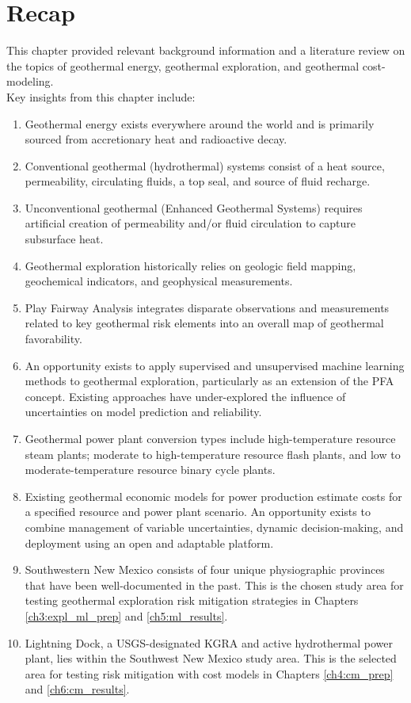 \section{Recap}\label{ch2:recap}
This chapter provided relevant background information and a literature review on the topics of geothermal energy, geothermal exploration, and geothermal cost-modeling.
\\
Key insights from this chapter include:
\begin{enumerate}
    \item Geothermal energy exists everywhere around the world and is primarily sourced from accretionary heat and radioactive decay.
    \item Conventional geothermal (hydrothermal) systems consist of a heat source, permeability, circulating fluids, a top seal, and source of fluid recharge.
    \item Unconventional geothermal (Enhanced Geothermal Systems) requires artificial creation of permeability and/or fluid circulation to capture subsurface heat.
    \item Geothermal exploration historically relies on geologic field mapping, geochemical indicators, and geophysical measurements.
    \item Play Fairway Analysis integrates disparate observations and measurements related to key geothermal risk elements into an overall map of geothermal favorability.
    \item An opportunity exists to apply supervised and unsupervised machine learning methods to geothermal exploration, particularly as an extension of the PFA concept. Existing approaches have under-explored the influence of uncertainties on model prediction and reliability.
    \item Geothermal power plant conversion types include high-temperature resource steam plants; moderate to high-temperature resource flash plants, and low to moderate-temperature resource binary cycle plants. 
    \item Existing geothermal economic models for power production estimate costs for a specified resource and power plant scenario. An opportunity exists to combine management of variable uncertainties, dynamic decision-making, and deployment using an open and adaptable platform.
    \item Southwestern New Mexico consists of four unique physiographic provinces that have been well-documented in the past. This is the chosen study area for testing geothermal exploration risk mitigation strategies in Chapters \ref{ch3:expl_ml_prep} and \ref{ch5:ml_results}.
    \item Lightning Dock, a USGS-designated KGRA and active hydrothermal power plant, lies within the Southwest New Mexico study area. This is the selected area for testing risk mitigation with cost models in Chapters \ref{ch4:cm_prep} and \ref{ch6:cm_results}.
\end{enumerate}
